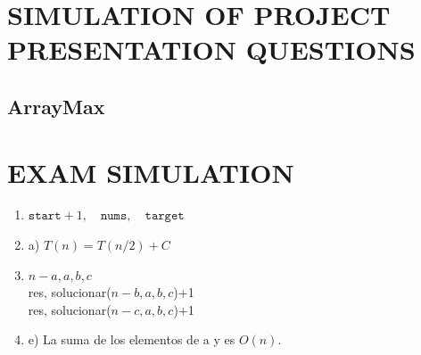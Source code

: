 \documentclass[a4paper,12pt]{article}
\begin{document}
    \section{SIMULATION OF PROJECT PRESENTATION QUESTIONS}
    \subsection{ArrayMax}
    \begin{figure}[ht]
      \begin{floatrow}
      \end{floatrow}
    \end{figure}

    \section{EXAM SIMULATION}
    \begin{enumerate}
      \item $\texttt{start}+1,\quad \texttt{nums},\quad \texttt{target}$
      \item a) $T(n) = T(n/2) + C$
      \item $n-a, a, b, c$\\
      res, solucionar($n-b,a,b,c$)+1\\
      res, solucionar($n-c,a,b,c$)+1
      \item e) La suma de los elementos de a y es $O(n)$.
    \end{enumerate}


    \newpage
    
    
\end{document}
